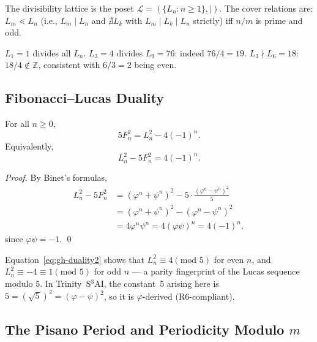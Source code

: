 \noindent The divisibility lattice is the poset
\(\mathcal{L} = (\{L_n : n \geq 1\}, \mid)\).
The cover relations are:
\(L_m \lessdot L_n\) (i.e., \(L_m \mid L_n\) and
\(\nexists L_k\) with \(L_m \mid L_k \mid L_n\) strictly)
iff \(n/m\) is prime and odd.

\begin{example}
\(L_1 = 1\) divides all \(L_n\).
\(L_3 = 4\) divides \(L_9 = 76\): indeed \(76 / 4 = 19\).
\(L_3 \nmid L_6 = 18\): \(18/4 \notin \mathbb{Z}\), consistent with
\(6/3 = 2\) being even.
\end{example}

\subsection{Fibonacci–Lucas Duality}
\label{sec:gh-duality}

\begin{theorem}
\label{thm:gh-duality}
For all \(n \geq 0\),
\begin{equation}\label{eq:gh-duality}
  5F_n^2 = L_n^2 - 4(-1)^n.
\end{equation}
Equivalently,
\begin{equation}\label{eq:gh-duality2}
  L_n^2 - 5F_n^2 = 4(-1)^n.
\end{equation}
\end{theorem}

\begin{proof}
By Binet's formulas,
\begin{align*}
  L_n^2 - 5F_n^2
  &= (\varphi^n+\psi^n)^2 - 5\cdot\frac{(\varphi^n-\psi^n)^2}{5}\\
  &= (\varphi^n+\psi^n)^2 - (\varphi^n-\psi^n)^2\\
  &= 4\varphi^n\psi^n
   = 4(\varphi\psi)^n
   = 4(-1)^n,
\end{align*}
since \(\varphi\psi = -1\).
\qed
\end{proof}

\begin{remark}
Equation~\eqref{eq:gh-duality2} shows that \(L_n^2 \equiv 4(\text{mod } 5)\)
for even \(n\), and \(L_n^2 \equiv -4 \equiv 1 (\text{mod } 5)\) for
odd \(n\) — a parity fingerprint of the Lucas sequence modulo 5.
In Trinity~S$^3$AI, the constant~5 arising here is
\(5 = (\sqrt{5})^2 = (\varphi - \psi)^2\), so it is
\(\varphi\)-derived (R6-compliant).
\end{remark}

\subsection{The Pisano Period and Periodicity Modulo \texorpdfstring{$m$}{m}}
\label{subsec:gh-pisano}

